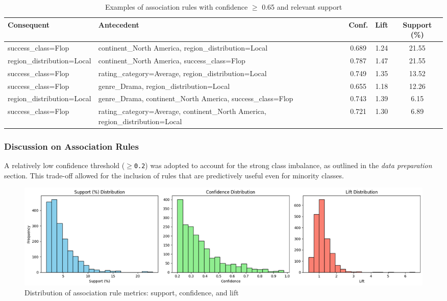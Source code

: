 \documentclass{article}
\begin{document}
\begin{table}[H]
\centering
\caption{Examples of association rules with confidence $\geq$ 0.65 and relevant support}
\label{tab:regole_flop}
\begin{tabular}{|p{4cm}|p{5.5cm}|c|c|c|}
\hline
\textbf{Consequent} & \textbf{Antecedent} & \textbf{Conf.} & \textbf{Lift} & \textbf{Support (\%)} \\
\hline
success\_class=Flop & continent\_North America, region\_distribution=Local & 0.689 & 1.24 & 21.55 \\
\hline
region\_distribution=Local & continent\_North America, success\_class=Flop & 0.787 & 1.47 & 21.55 \\
\hline
success\_class=Flop & rating\_category=Average, region\_distribution=Local & 0.749 & 1.35 & 13.52 \\
\hline
success\_class=Flop & genre\_Drama, region\_distribution=Local & 0.655 & 1.18 & 12.26 \\
\hline
region\_distribution=Local & genre\_Drama, continent\_North America, success\_class=Flop & 0.743 & 1.39 & 6.15 \\
\hline
success\_class=Flop & rating\_category=Average, continent\_North America, region\_distribution=Local & 0.721 & 1.30 & 6.89 \\
\hline
\end{tabular}
\end{table}

\subsubsection{Discussion on Association Rules}

A relatively low confidence threshold (\texttt{$\geqslant$0.2}) was adopted to account for the strong class imbalance, as outlined in the \emph{data preparation} section. This trade-off allowed for the inclusion of rules that are predictively useful even for minority classes.

\begin{figure}[H]
\centering
\includegraphics[width=\textwidth]{dist_sup_lift_conf.png}
\caption{Distribution of association rule metrics: support, confidence, and lift}
\label{fig:metriche_regole}
\end{figure}
\end{document}
